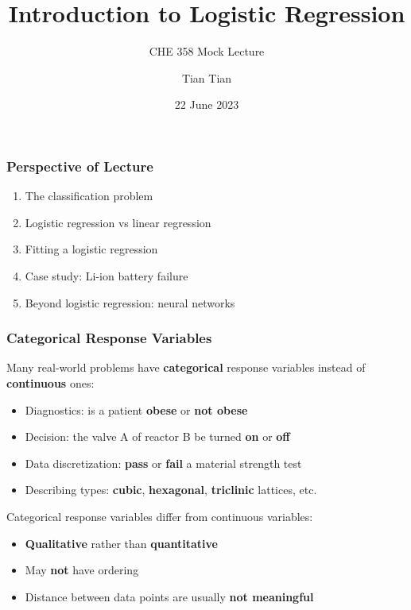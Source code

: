 \documentclass[10pt,aspectratio=169]{beamer}
\title{\Large \bfseries Introduction to Logistic Regression}
\subtitle{CHE 358 Mock Lecture}
\author{Tian Tian}
\date{22 June 2023}
\begin{document}
    
\frame{\titlepage}


\begin{frame}
\frametitle{Perspective of Lecture}
\begin{enumerate}
\item The classification problem
\item Logistic regression vs linear regression
\item Fitting a logistic regression
\item Case study: Li-ion battery failure
\item Beyond logistic regression: neural networks
\end{enumerate}
\end{frame}

\begin{frame}
  \frametitle{Categorical Response Variables}

  Many real-world problems
  have \textbf{categorical} response variables instead of
  \textbf{continuous} ones:

  \begin{itemize}
    \item Diagnostics: 	is a patient \textbf{obese} or \textbf{not obese}
\item Decision:      	the valve A of reactor B be turned \textbf{on} or \textbf{off}
\item Data discretization:  \textbf{pass} or \textbf{fail} a material strength test
\item Describing types: \textbf{cubic}, \textbf{hexagonal}, \textbf{triclinic} lattices, etc.

\end{itemize}

\vspace{2em}

Categorical response variables differ from continuous variables:
\begin{itemize}
\item \textbf{Qualitative} rather than \textbf{quantitative}
\item May \textbf{not} have ordering
\item Distance between data points are usually \textbf{not meaningful}
\end{itemize}


\end{frame}
\end{document}

